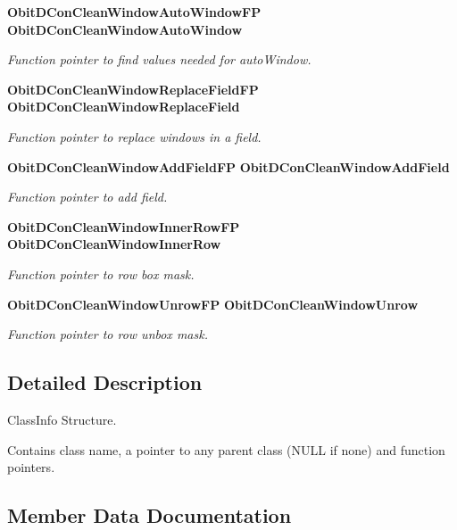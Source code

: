 \begin{CompactItemize}
{\bf Obit\-DCon\-Clean\-Window\-Auto\-Window\-FP} {\bf Obit\-DCon\-Clean\-Window\-Auto\-Window}
\begin{CompactList}\small\item\em Function pointer to find values needed for auto\-Window. \item\end{CompactList}\item 
{\bf Obit\-DCon\-Clean\-Window\-Replace\-Field\-FP} {\bf Obit\-DCon\-Clean\-Window\-Replace\-Field}
\begin{CompactList}\small\item\em Function pointer to replace windows in a field. \item\end{CompactList}\item 
{\bf Obit\-DCon\-Clean\-Window\-Add\-Field\-FP} {\bf Obit\-DCon\-Clean\-Window\-Add\-Field}
\begin{CompactList}\small\item\em Function pointer to add field. \item\end{CompactList}\item 
{\bf Obit\-DCon\-Clean\-Window\-Inner\-Row\-FP} {\bf Obit\-DCon\-Clean\-Window\-Inner\-Row}
\begin{CompactList}\small\item\em Function pointer to row box mask. \item\end{CompactList}\item 
{\bf Obit\-DCon\-Clean\-Window\-Unrow\-FP} {\bf Obit\-DCon\-Clean\-Window\-Unrow}
\begin{CompactList}\small\item\em Function pointer to row unbox mask. \item\end{CompactList}\end{CompactItemize}


\subsection{Detailed Description}
Class\-Info Structure. 

Contains class name, a pointer to any parent class (NULL if none) and function pointers. 



\subsection{Member Data Documentation}
